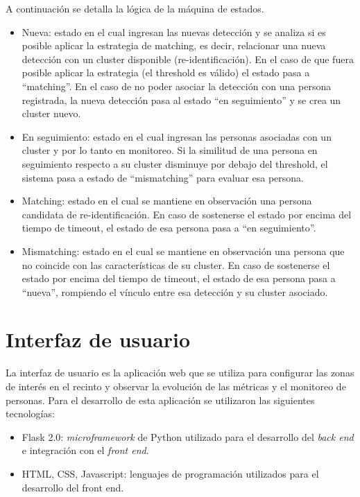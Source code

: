 A continuación se detalla la lógica de la máquina de estados.
\begin{itemize}
\item Nueva: estado en el cual ingresan las nuevas detección y se analiza si es posible aplicar la estrategia de matching, es decir, relacionar una nueva detección con un cluster disponible (re-identificación). En el caso de que fuera posible aplicar la estrategia (el threshold es válido) el estado pasa a ``matching''. En el caso de no poder asociar la detección con una persona registrada, la nueva detección pasa al estado ``en seguimiento'' y se crea un cluster nuevo.
\item En seguimiento: estado en el cual ingresan las personas asociadas con un cluster y por lo tanto en monitoreo. Si la similitud de una persona en seguimiento respecto a su cluster disminuye por debajo del threshold, el sistema pasa a estado de ``mismatching'' para evaluar esa persona.
\item Matching: estado en el cual se mantiene en observación una persona candidata de re-identificación. En caso de sostenerse el estado por encima del tiempo de timeout, el estado de esa persona pasa a ``en seguimiento''.
\item Mismatching: estado en el cual se mantiene en observación una persona que no coincide con las características de su cluster. En caso de sostenerse el estado por encima del tiempo de timeout, el estado de esa persona pasa a ``nueva'', rompiendo el vínculo entre esa detección y su cluster asociado.
\end{itemize}

\newpage


\section{Interfaz de usuario}
\label{sec:gui}

La interfaz de usuario es la aplicación web que se utiliza para configurar las zonas de interés en el recinto y observar la evolución de las métricas y el monitoreo de personas. Para el desarrollo de esta aplicación se utilizaron las siguientes tecnologías:
\begin{itemize}
\item Flask 2.0: \textit{microframework} \citep{FLASK} de Python utilizado para el desarrollo del \textit{back end} e integración con el \textit{front end}.
\item HTML, CSS, Javascript: lenguajes de programación utilizados para el desarrollo del front end.
\end{itemize}


